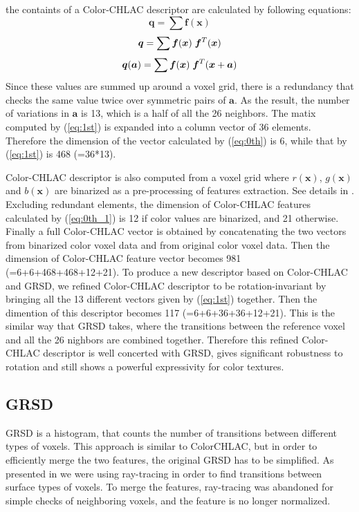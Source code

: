 \documentclass[conference]{sty/IEEEtran}
\begin{document}
   the containts of a Color-CHLAC descriptor are calculated by following equations:
\begin{equation}\label{eq:0th}
  {\bm q} = \sum \bm{f}({\bm x})
\end{equation}
\begin{equation}\label{eq:0th_1}
  {\bm q} = \sum \bm{f}({\bm x}) \hspace{1mm}\bm{f}^T({\bm x}) \\
\end{equation}
\begin{equation}\label{eq:1st}
  {\bm q}({\bm a}) = \sum \bm{f}({\bm x}) \hspace{1mm}\bm{f}^T({\bm x}+{\bm a}) \\
\end{equation}
%
Since these values are summed up around a voxel grid, there is a redundancy that checks the same value twice over symmetric pairs of ${\bm a}$. 
As the result, the number of variations in ${\bm a}$ is 13, which is a half of all the 26 neighbors.
The matix computed by (\ref{eq:1st}) is expanded into a column vector of 36 elements.
Therefore the dimension of the vector calculated by (\ref{eq:0th}) is 6, while that by (\ref{eq:1st}) is 468 (=36*13).
 
 Color-CHLAC descriptor is also computed from a voxel grid where $r(\bm{x})$, $g(\bm{x})$ and $b(\bm{x})$ are binarized as a pre-processing of features extraction. See details in \cite{kanezaki2010icra}. 
 Excluding redundant elements, the dimension of Color-CHLAC features calculated by (\ref{eq:0th_1}) is 12 if color values are binarized, and 21 otherwise. 
 Finally a full Color-CHLAC vector is obtained by concatenating the two vectors from binarized color voxel data and from original color voxel data. 
 Then the dimension of Color-CHLAC feature vector becomes 981 (=6+6+468+468+12+21).
 To produce a new descriptor based on Color-CHLAC and GRSD, we refined Color-CHLAC descriptor to be rotation-invariant by bringing all the 13 different vectors given by (\ref{eq:1st}) together. 
 Then the dimention of this descriptor becomes 117 (=6+6+36+36+12+21). 
 This is the similar way that GRSD takes, where the transitions between the reference voxel and all the 26 nighbors are combined together. 
 Therefore this refined Color-CHLAC descriptor is well concerted with GRSD, gives significant robustness to rotation and still shows a powerful expressivity for color textures.

\subsection{GRSD}
%
GRSD is a histogram, that counts the number of transitions between different types of voxels.
This approach is similar to ColorCHLAC, but in order to efficiently merge the two features,
the original GRSD has to be simplified. As presented in \cite{GRSD10Humanoids} we were using
ray-tracing in order to find transitions between surface types of voxels. To merge the features,
ray-tracing was abandoned for simple checks of neighboring voxels, and the feature is no longer normalized.
\end{document}

